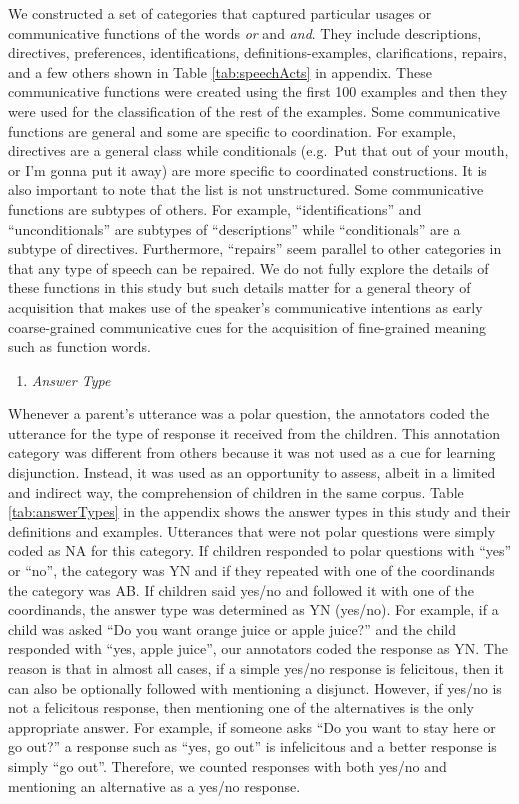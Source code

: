 \documentclass[,man,floatsintext]{apa6}
\providecommand{\tightlist}{%
  \setlength{\itemsep}{0pt}\setlength{\parskip}{0pt}}
\begin{document}
We constructed a set of categories that captured particular usages or communicative functions of the words \emph{or} and \emph{and}. They include descriptions, directives, preferences, identifications, definitions-examples, clarifications, repairs, and a few others shown in Table \ref{tab:speechActs} in appendix. These communicative functions were created using the first 100 examples and then they were used for the classification of the rest of the examples. Some communicative functions are general and some are specific to coordination. For example, directives are a general class while conditionals (e.g.~Put that out of your mouth, or I'm gonna put it away) are more specific to coordinated constructions. It is also important to note that the list is not unstructured. Some communicative functions are subtypes of others. For example, \enquote{identifications} and \enquote{unconditionals} are subtypes of \enquote{descriptions} while \enquote{conditionals} are a subtype of directives. Furthermore, \enquote{repairs} seem parallel to other categories in that any type of speech can be repaired. We do not fully explore the details of these functions in this study but such details matter for a general theory of acquisition that makes use of the speaker's communicative intentions as early coarse-grained communicative cues for the acquisition of fine-grained meaning such as function words.

\begin{enumerate}
\def\labelenumi{\arabic{enumi}.}
\setcounter{enumi}{6}
\tightlist
\item
  \emph{Answer Type}
\end{enumerate}

Whenever a parent's utterance was a polar question, the annotators coded the utterance for the type of response it received from the children. This annotation category was different from others because it was not used as a cue for learning disjunction. Instead, it was used as an opportunity to assess, albeit in a limited and indirect way, the comprehension of children in the same corpus. Table \ref{tab:answerTypes} in the appendix shows the answer types in this study and their definitions and examples. Utterances that were not polar questions were simply coded as NA for this category. If children responded to polar questions with \enquote{yes} or \enquote{no}, the category was YN and if they repeated with one of the coordinands the category was AB. If children said yes/no and followed it with one of the coordinands, the answer type was determined as YN (yes/no). For example, if a child was asked \enquote{Do you want orange juice or apple juice?} and the child responded with \enquote{yes, apple juice}, our annotators coded the response as YN. The reason is that in almost all cases, if a simple yes/no response is felicitous, then it can also be optionally followed with mentioning a disjunct. However, if yes/no is not a felicitous response, then mentioning one of the alternatives is the only appropriate answer. For example, if someone asks \enquote{Do you want to stay here or go out?} a response such as \enquote{yes, go out} is infelicitous and a better response is simply \enquote{go out}. Therefore, we counted responses with both yes/no and mentioning an alternative as a yes/no response.
\end{document}
